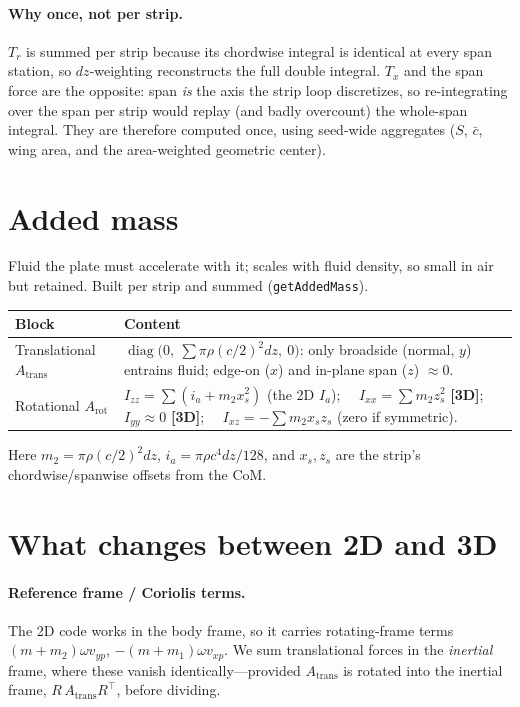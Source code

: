 \documentclass[11pt]{article}
\newcommand{\newin}{{\small\textbf{\color{blue}[3D]}}}          %
\begin{document}
\paragraph{Why once, not per strip.} $T_r$ is summed per strip because its chordwise
integral is identical at every span station, so $dz$-weighting reconstructs the full
double integral. $T_x$ and the span force are the opposite: span \emph{is} the axis the
strip loop discretizes, so re-integrating over the span per strip would replay (and badly
overcount) the whole-span integral. They are therefore computed once, using seed-wide
aggregates ($S$, $\bar c$, wing area, and the area-weighted geometric center).

\section*{Added mass}
Fluid the plate must accelerate with it; scales with fluid density, so small in air but
retained. Built per strip and summed (\texttt{getAddedMass}).

\begin{tabularx}{\textwidth}{@{} l L @{}}
\toprule
\textbf{Block} & \textbf{Content} \\
\midrule
Translational $A_{\text{trans}}$ &
$\operatorname{diag}\!\big(0,\ \textstyle\sum \pi\rho(c/2)^2 dz,\ 0\big)$: only broadside (normal, $y$)
entrains fluid; edge-on ($x$) and in-plane span ($z$) $\approx 0$. \\
Rotational $A_{\text{rot}}$ &
$I_{zz}=\sum(i_a+m_2 x_s^2)$ (the 2D $I_a$); \ \ $I_{xx}=\sum m_2 z_s^2$ \newin{}; \ \
$I_{yy}\approx 0$ \newin{}; \ \ $I_{xz}=-\sum m_2 x_s z_s$ (zero if symmetric). \\
\bottomrule
\end{tabularx}

\noindent Here $m_2=\pi\rho(c/2)^2 dz$, $i_a=\pi\rho c^4 dz/128$, and $x_s,z_s$ are the
strip's chordwise/spanwise offsets from the CoM.

\section*{What changes between 2D and 3D}

\paragraph{Reference frame / Coriolis terms.} The 2D code works in the body frame, so it
carries rotating-frame terms $(m{+}m_2)\omega v_{yp}$, $-(m{+}m_1)\omega v_{xp}$. We sum
translational forces in the \emph{inertial} frame, where these vanish identically---provided
$A_{\text{trans}}$ is rotated into the inertial frame, $R\,A_{\text{trans}}R^{\top}$, before
dividing.
\end{document}
